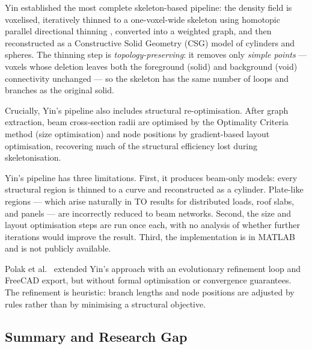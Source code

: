 \documentclass[11pt,a4paper]{article}
\begin{document}

Yin \cite{yin2020} established the most complete skeleton-based pipeline:
the density field is voxelised, iteratively thinned to a one-voxel-wide
skeleton using homotopic parallel directional thinning \cite{bertrand1994},
converted into a weighted graph, and then reconstructed as a
Constructive Solid Geometry (CSG) model of cylinders and spheres.
The thinning step is \emph{topology-preserving}: it removes only
\emph{simple points} --- voxels whose deletion leaves both the foreground
(solid) and background (void) connectivity unchanged --- so the skeleton
has the same number of loops and branches as the original solid.

Crucially, Yin's pipeline also includes structural re-optimisation.
After graph extraction, beam cross-section radii are optimised by the
Optimality Criteria method (size optimisation) and node positions by
gradient-based layout optimisation, recovering much of the structural
efficiency lost during skeletonisation.


Yin's pipeline has three limitations.
First, it produces beam-only models: every structural region is thinned to a
curve and reconstructed as a cylinder.
Plate-like regions --- which arise naturally in TO results for distributed
loads, roof slabs, and panels --- are incorrectly reduced to beam networks.
Second, the size and layout optimisation steps are run once each, with no
analysis of whether further iterations would improve the result.
Third, the implementation is in MATLAB and is not publicly available.

Polak et al.\ \cite{polak2023} extended Yin's approach with an evolutionary
refinement loop and FreeCAD export, but without formal optimisation or
convergence guarantees.
The refinement is heuristic: branch lengths and node positions are adjusted
by rules rather than by minimising a structural objective.

\subsection{Summary and Research Gap}
\label{subsec:gap}
\end{document}
